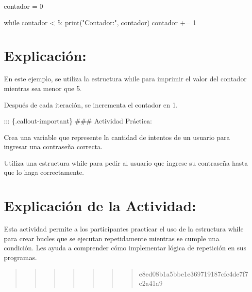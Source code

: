 \documentclass[
  a4paper,
  onepage,
  openany]{scrreprt}
\newenvironment{Shaded}{\begin{snugshade}}{\end{snugshade}}
\newcommand{\BuiltInTok}[1]{\textcolor[rgb]{0.00,0.23,0.31}{#1}}
\newcommand{\ControlFlowTok}[1]{\textcolor[rgb]{0.00,0.23,0.31}{#1}}
\newcommand{\DecValTok}[1]{\textcolor[rgb]{0.68,0.00,0.00}{#1}}
\newcommand{\NormalTok}[1]{\textcolor[rgb]{0.00,0.23,0.31}{#1}}
\newcommand{\OperatorTok}[1]{\textcolor[rgb]{0.37,0.37,0.37}{#1}}
\newcommand{\StringTok}[1]{\textcolor[rgb]{0.13,0.47,0.30}{#1}}
\begin{document}
\begin{Shaded}
\begin{Highlighting}[]
\NormalTok{contador }\OperatorTok{=} \DecValTok{0}

\ControlFlowTok{while}\NormalTok{ contador }\OperatorTok{\textless{}} \DecValTok{5}\NormalTok{:}
    \BuiltInTok{print}\NormalTok{(}\StringTok{"Contador:"}\NormalTok{, contador)}
\NormalTok{    contador }\OperatorTok{+=} \DecValTok{1}
\end{Highlighting}
\end{Shaded}

\hypertarget{explicaciuxf3n-37}{%
\section{Explicación:}\label{explicaciuxf3n-37}}

En este ejemplo, se utiliza la estructura while para imprimir el valor
del contador mientras sea menor que 5.

Después de cada iteración, se incrementa el contador en 1.

::: \{.callout-important\} \#\#\# Actividad Práctica:

Crea una variable que represente la cantidad de intentos de un usuario
para ingresar una contraseña correcta.

Utiliza una estructura while para pedir al usuario que ingrese su
contraseña hasta que lo haga correctamente.

\hypertarget{explicaciuxf3n-de-la-actividad-35}{%
\section{Explicación de la
Actividad:}\label{explicaciuxf3n-de-la-actividad-35}}

Esta actividad permite a los participantes practicar el uso de la
estructura while para crear bucles que se ejecutan repetidamente
mientras se cumple una condición. Les ayuda a comprender cómo
implementar lógica de repetición en sus programas.

\begin{quote}
\begin{quote}
\begin{quote}
\begin{quote}
\begin{quote}
\begin{quote}
\begin{quote}
e8ed08b1a5bbe1e369719187cfc4de7f7e2a41a9
\end{quote}
\end{quote}
\end{quote}
\end{quote}
\end{quote}
\end{quote}
\end{quote}
\end{document}
